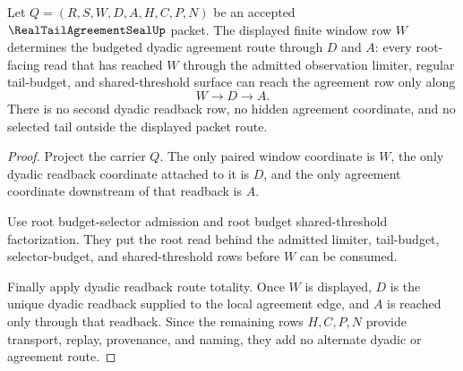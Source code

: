 \begin{theorem}
\label{thm:real-tail-agreement-seal-root-window-budget-determinacy}
Let $Q=(R,S,W,D,A,H,C,P,N)$ be an accepted $\RealTailAgreementSealUp$ packet. The displayed finite window row $W$ determines the budgeted dyadic agreement route through $D$ and $A$: every root-facing read that has reached $W$ through the admitted observation limiter, regular tail-budget, and shared-threshold surface can reach the agreement row only along
$$
W \to D \to A.
$$
There is no second dyadic readback row, no hidden agreement coordinate, and no selected tail outside the displayed packet route.
\end{theorem}
\begin{proof}
Project the carrier $Q$. The only paired window coordinate is $W$, the only dyadic readback coordinate attached to it is $D$, and the only agreement coordinate downstream of that readback is $A$.

Use root budget-selector admission and root budget shared-threshold factorization. They put the root read behind the admitted limiter, tail-budget, selector-budget, and shared-threshold rows before $W$ can be consumed.

Finally apply dyadic readback route totality. Once $W$ is displayed, $D$ is the unique dyadic readback supplied to the local agreement edge, and $A$ is reached only through that readback. Since the remaining rows $H,C,P,N$ provide transport, replay, provenance, and naming, they add no alternate dyadic or agreement route.
\end{proof}

